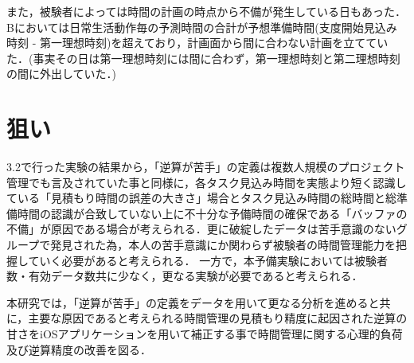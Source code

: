 また，被験者によっては時間の計画の時点から不備が発生している日もあった．Bにおいては日常生活動作毎の予測時間の合計が予想準備時間(支度開始見込み時刻 - 第一理想時刻)を超えており，計画面から間に合わない計画を立てていた．(事実その日は第一理想時刻には間に合わず，第一理想時刻と第二理想時刻の間に外出していた．)



\section{狙い}
3.2で行った実験の結果から，「逆算が苦手」の定義は複数人規模のプロジェクト管理でも言及されていた事と同様に，各タスク見込み時間を実態より短く認識している「見積もり時間の誤差の大きさ」場合とタスク見込み時間の総時間と総準備時間の認識が合致していない上に不十分な予備時間の確保である「バッファの不備」が原因である場合が考えられる．更に破綻したデータは苦手意識のないグループで発見された為，本人の苦手意識にか関わらず被験者の時間管理能力を把握していく必要があると考えられる．
一方で，本予備実験においては被験者数・有効データ数共に少なく，更なる実験が必要であると考えられる．

本研究では，「逆算が苦手」の定義をデータを用いて更なる分析を進めると共に，主要な原因であると考えられる時間管理の見積もり精度に起因された逆算の甘さをiOSアプリケーションを用いて補正する事で時間管理に関する心理的負荷及び逆算精度の改善を図る．